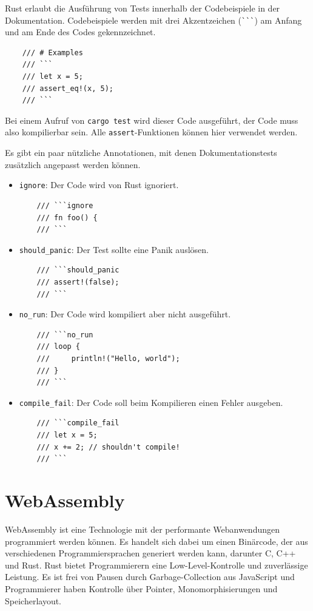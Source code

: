 Rust erlaubt die Ausführung von Tests innerhalb der Codebeispiele in der Dokumentation. Codebeispiele werden mit drei Akzentzeichen (\verb"```") am Anfang und am Ende des Codes gekennzeichnet.

\begin{lstlisting}
    /// # Examples
    /// ```
    /// let x = 5;
    /// assert_eq!(x, 5);
    /// ```
\end{lstlisting}

Bei einem Aufruf von \verb"cargo test" wird dieser Code ausgeführt, der Code muss also kompilierbar sein. Alle \verb"assert"-Funktionen können hier verwendet werden.

Es gibt ein paar nützliche Annotationen, mit denen Dokumentationstests zu\-sätz\-lich angepasst werden können.

\begin{itemize}
    \item \verb"ignore": Der Code wird von Rust ignoriert.
\begin{lstlisting}
    /// ```ignore
    /// fn foo() {
    /// ```
\end{lstlisting}
\item \verb"should_panic": Der Test sollte eine Panik auslösen.
\begin{lstlisting}
    /// ```should_panic
    /// assert!(false);
    /// ```
\end{lstlisting}
\item \verb"no_run": Der Code wird kompiliert aber nicht ausgeführt.
\begin{lstlisting}
    /// ```no_run
    /// loop {
    ///     println!("Hello, world");
    /// }
    /// ```
\end{lstlisting}
\item \verb"compile_fail": Der Code soll beim Kompilieren einen Fehler ausgeben.
\begin{lstlisting}
    /// ```compile_fail
    /// let x = 5;
    /// x += 2; // shouldn't compile!
    /// ```
\end{lstlisting}
\end{itemize}


\section{WebAssembly}

WebAssembly ist eine Technologie mit der performante Webanwendungen programmiert werden können. Es handelt sich dabei um einen Binärcode, der aus verschiedenen Programmiersprachen generiert werden kann, darunter C, C++ und Rust. Rust bietet Programmierern eine Low-Level-Kontrolle und zuverlässige Leistung. Es ist frei von Pausen durch Garbage-Collection aus JavaScript und Programmierer haben Kontrolle über Pointer, Monomorphisierungen und Speicherlayout.


